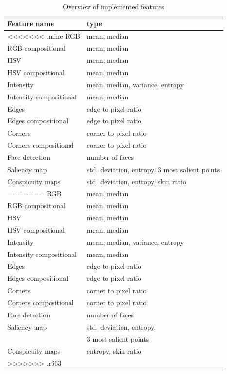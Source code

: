 \begin{table}[htb]
    \centering
    \begin{tabular}	{ | l | l | } 
		\hline
		Feature name & type \\
		\hline
<<<<<<< .mine
		RGB & mean, median \\
		RGB compositional & mean, median \\
		HSV & mean, median \\
		HSV compositional & mean, median \\
		Intensity & mean, median, variance, entropy \\
		Intensity compositional & mean, median \\				
		Edges & edge to pixel ratio \\
		Edges compositional & edge to pixel ratio \\
		Corners & corner to pixel ratio \\
		Corners compositional & corner to pixel ratio \\
		Face detection & number of faces \\
		Saliency map & std. deviation, entropy, 3 most salient points  \\
		Conspicuity maps & std. deviation, entropy, skin ratio \\		
=======
		RGB & mean, median \\
		RGB compositional & mean, median \\
		HSV & mean, median \\
		HSV compositional & mean, median \\
		Intensity & mean, median, variance, entropy \\
		Intensity compositional & mean, median \\				
		Edges & edge to pixel ratio \\
		Edges compositional & edge to pixel ratio \\
		Corners & corner to pixel ratio \\
		Corners compositional & corner to pixel ratio \\
		Face detection & number of faces \\
		Saliency map & std. deviation, entropy, \\
		& 3 most salient points  \\
		Conspicuity maps & entropy, skin ratio \\		
>>>>>>> .r663
		\hline
    \end{tabular}
    \caption{Overview of implemented features}
    \label{tab:featurelist}
\end{table}

